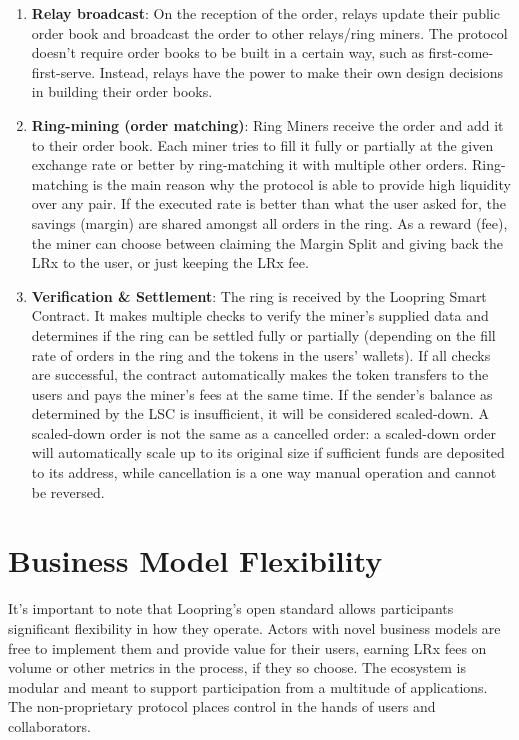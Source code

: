 \documentclass[UTF8,nofonts]{article}
\begin{document}
\begin{multicols}{2}
\begin{enumerate}
\item \textbf{Relay broadcast}: On the reception of the order, relays update their public order book and broadcast the order to other relays/ring miners. The protocol doesn't require order books to be built in a certain way, such as first-come-first-serve. Instead, relays have the power to make their own design decisions in building their order books.

\item \textbf{Ring-mining (order matching)}: Ring Miners receive the order and add it to their order book. Each miner tries to fill it fully or partially at the given exchange rate or better by ring-matching it with multiple other orders. Ring-matching is the main reason why the protocol is able to provide high liquidity over any pair. If the executed rate is better than what the user asked for, the savings (margin) are shared amongst all orders in the ring. As a reward (fee), the miner can choose between claiming the Margin Split and giving back the LRx to the user, or just keeping the LRx fee.

\item \textbf{Verification \& Settlement}: The ring is received by the Loopring Smart Contract. It makes multiple checks to verify the miner's supplied data and determines if the ring can be settled fully or partially (depending on the fill rate of orders in the ring and the tokens in the users' wallets). If all checks are successful, the contract automatically makes the token transfers to the users and pays the miner's fees at the same time. If the sender's balance as determined by the LSC is insufficient, it will be considered scaled-down. A scaled-down order is not the same as a cancelled order: a scaled-down order will automatically scale up to its original size if sufficient funds are deposited to its address, while cancellation is a one way manual operation and cannot be reversed.

\end{enumerate}

\section{Business Model Flexibility\label{sec:business_model}}
It's important to note that Loopring's open standard allows participants significant flexibility in how they operate. Actors with novel business models are free to implement them and provide value for their users, earning LRx fees on volume or other metrics in the process, if they so choose. The ecosystem is modular and meant to support participation from a multitude of applications. The non-proprietary protocol places control in the hands of users and collaborators.


\end{multicols}
\end{document}
